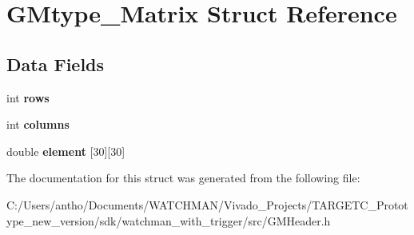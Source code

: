 \section{G\+Mtype\+\_\+\+Matrix Struct Reference}
\label{struct_g_mtype___matrix}
\subsection*{Data Fields}
\begin{DoxyCompactItemize}
\item 
\mbox{\label{struct_g_mtype___matrix_a061459acc9e078fa4699e0e349887215}} 
int {\bfseries rows}
\item 
\mbox{\label{struct_g_mtype___matrix_a341d2f00089fffc71eb6dbfd29f56c89}} 
int {\bfseries columns}
\item 
\mbox{\label{struct_g_mtype___matrix_a65ff66015a15486bd6756f66941e2a70}} 
double {\bfseries element} [30][30]
\end{DoxyCompactItemize}


The documentation for this struct was generated from the following file\+:\begin{DoxyCompactItemize}
\item 
C\+:/\+Users/antho/\+Documents/\+W\+A\+T\+C\+H\+M\+A\+N/\+Vivado\+\_\+\+Projects/\+T\+A\+R\+G\+E\+T\+C\+\_\+\+Prototype\+\_\+new\+\_\+version/sdk/watchman\+\_\+with\+\_\+trigger/src/G\+M\+Header.\+h\end{DoxyCompactItemize}
